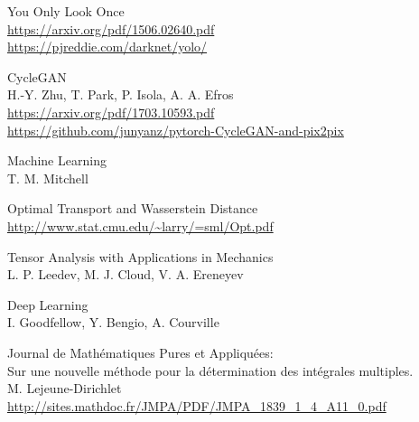 \documentclass{article}
\begin{document}
\begin{thebibliography}{1}
        You Only Look Once
        \\
        \url{https://arxiv.org/pdf/1506.02640.pdf}
        \\
        \url{https://pjreddie.com/darknet/yolo/}
    
        CycleGAN
        \\
        H.-Y. Zhu, T. Park, P. Isola, A. A. Efros
        \\
        \url{https://arxiv.org/pdf/1703.10593.pdf}
        \\
        \url{https://github.com/junyanz/pytorch-CycleGAN-and-pix2pix}

    Machine Learning
    \\
    T. M. Mitchell

    Optimal Transport and Wasserstein Distance 
    \\
    \url{http://www.stat.cmu.edu/~larry/=sml/Opt.pdf}

    Tensor Analysis with Applications in Mechanics
    \\
    L. P. Leedev, M. J. Cloud, V. A. Ereneyev

    Deep Learning
    \\
    I. Goodfellow, Y. Bengio, A. Courville

    Journal de Mathématiques Pures et Appliquées:\\
    Sur une nouvelle méthode pour la détermination des intégrales multiples.
    \\
    M. Lejeune-Dirichlet
    \\
    \url{http://sites.mathdoc.fr/JMPA/PDF/JMPA_1839_1_4_A11_0.pdf}

\end{thebibliography}
\end{document}
